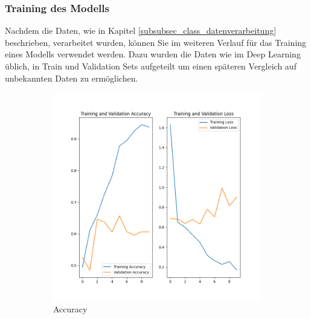 \subsubsection{Training des Modells} \label{subsubsec_class_training}
Nachdem die Daten, wie in Kapitel \ref{subsubsec_class_datenverarbeitung} beschrieben, verarbeitet wurden, können Sie im weiteren Verlauf für das Training eines Modells verwendet werden.
Dazu wurden die Daten wie im Deep Learning üblich, in Train und Validation Sets aufgeteilt um einen späteren Vergleich auf unbekannten Daten zu ermöglichen.
\begin{figure}[!h]
    \centering
    \begin{subfigure}[b]{0.49\textwidth}
        \includegraphics[width=\textwidth]{abbildungen/acc_train_val.png}
        \caption {Accuracy}
        \label{fig:metricsTrainAcc}
    \end{subfigure}
    \begin{subfigure}[b]{0.49\textwidth}

\end{subfigure}
\end{figure}
